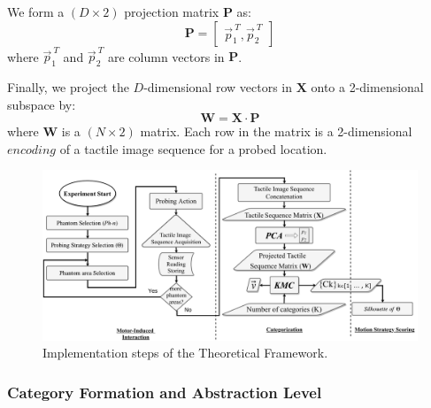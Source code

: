 \documentclass[]{interact}
\theoremstyle{plain}%
\theoremstyle{definition}
\theoremstyle{remark}
\begin{document}
We form a $(D\times 2)$ projection matrix $\mathbf{P}$ as:
\begin{equation}
\mathbf{P}=\begin{bmatrix}\vec{p}_1^{\ T}, \vec{p}_2^{\ T}\end{bmatrix}	
\end{equation}
where $\vec{p}_1^{\ T}$ and $\vec{p}_2^{\ T}$ are column vectors in $\mathbf{P}$. 

Finally, we project the $D$-dimensional row vectors in $\mathbf{X}$ onto a 2-dimensional subspace by:
\begin{equation}
\mathbf{W}=\mathbf{X}\cdot \mathbf{P}
\end{equation}
where $\mathbf{W}$ is a $(N\times 2)$ matrix. Each row in the matrix is a 2-dimensional $encoding$ of a 
tactile image sequence for a probed location.

\begin{figure}[]
	\centering
	\includegraphics[width=.9\textwidth]{./figs/motion_primitive_preprocessing.pdf}
	\caption{Implementation steps of the Theoretical Framework.} %
	\label{self_org_processing}
\end{figure}

\subsubsection{Category Formation and Abstraction Level}\label{sec_clustering}
\end{document}
